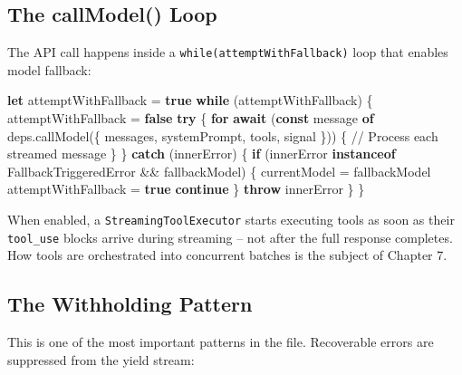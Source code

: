 \documentclass[
  english,
  11pt,
  letterpaper,
]{book}
\newenvironment{Shaded}{\begin{snugshade}}{\end{snugshade}}
\newcommand{\CommentTok}[1]{\textcolor[rgb]{0.37,0.37,0.37}{#1}}
\newcommand{\ControlFlowTok}[1]{\textcolor[rgb]{0.00,0.23,0.31}{\textbf{#1}}}
\newcommand{\FunctionTok}[1]{\textcolor[rgb]{0.28,0.35,0.67}{#1}}
\newcommand{\KeywordTok}[1]{\textcolor[rgb]{0.00,0.23,0.31}{\textbf{#1}}}
\newcommand{\NormalTok}[1]{\textcolor[rgb]{0.00,0.23,0.31}{#1}}
\newcommand{\OperatorTok}[1]{\textcolor[rgb]{0.37,0.37,0.37}{#1}}
\begin{document}
\subsection{The callModel() Loop}\label{the-callmodel-loop}

The API call happens inside a \texttt{while(attemptWithFallback)} loop
that enables model fallback:

\begin{Shaded}
\begin{Highlighting}[]
\KeywordTok{let}\NormalTok{ attemptWithFallback }\OperatorTok{=} \KeywordTok{true}
\ControlFlowTok{while}\NormalTok{ (attemptWithFallback) \{}
\NormalTok{  attemptWithFallback }\OperatorTok{=} \KeywordTok{false}
  \ControlFlowTok{try}\NormalTok{ \{}
    \ControlFlowTok{for} \ControlFlowTok{await}\NormalTok{ (}\KeywordTok{const}\NormalTok{ message }\KeywordTok{of}\NormalTok{ deps}\OperatorTok{.}\FunctionTok{callModel}\NormalTok{(\{ messages}\OperatorTok{,}\NormalTok{ systemPrompt}\OperatorTok{,}\NormalTok{ tools}\OperatorTok{,}\NormalTok{ signal \})) \{}
      \CommentTok{// Process each streamed message}
\NormalTok{    \}}
\NormalTok{  \} }\ControlFlowTok{catch}\NormalTok{ (innerError) \{}
    \ControlFlowTok{if}\NormalTok{ (innerError }\KeywordTok{instanceof}\NormalTok{ FallbackTriggeredError }\OperatorTok{\&\&}\NormalTok{ fallbackModel) \{}
\NormalTok{      currentModel }\OperatorTok{=}\NormalTok{ fallbackModel}
\NormalTok{      attemptWithFallback }\OperatorTok{=} \KeywordTok{true}
      \ControlFlowTok{continue}
\NormalTok{    \}}
    \ControlFlowTok{throw}\NormalTok{ innerError}
\NormalTok{  \}}
\NormalTok{\}}
\end{Highlighting}
\end{Shaded}

When enabled, a \texttt{StreamingToolExecutor} starts executing tools as
soon as their \texttt{tool\_use} blocks arrive during streaming -- not
after the full response completes. How tools are orchestrated into
concurrent batches is the subject of Chapter 7.

\subsection{The Withholding Pattern}\label{the-withholding-pattern}

This is one of the most important patterns in the file. Recoverable
errors are suppressed from the yield stream:
\end{document}
